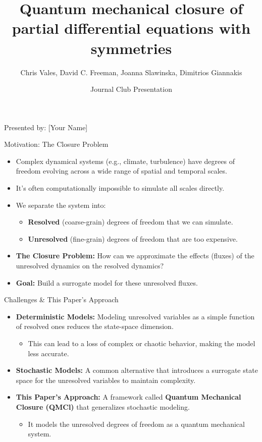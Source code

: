 \documentclass{beamer}
\title[JC: QM Closure for PDEs]{Quantum mechanical closure of partial differential equations with symmetries}
\author{Chris Vales, David C. Freeman, Joanna Slawinska, Dimitrios Giannakis}
\institute{Department of Mathematics, Dartmouth College}
\date{Journal Club Presentation}
\begin{document}
\begin{frame}
    \titlepage
    \begin{center}
        \vspace{1cm}
        Presented by: [Your Name]
    \end{center}
\end{frame}

\begin{frame}{Motivation: The Closure Problem}
    \begin{itemize}
        \item Complex dynamical systems (e.g., climate, turbulence) have degrees of freedom evolving across a wide range of spatial and temporal scales.
        \item It's often computationally impossible to simulate all scales directly.
        \item We separate the system into:
        \begin{itemize}
            \item \textbf{Resolved} (coarse-grain) degrees of freedom that we can simulate.
            \item \textbf{Unresolved} (fine-grain) degrees of freedom that are too expensive.
        \end{itemize}
        \item \textbf{The Closure Problem:} How can we approximate the effects (fluxes) of the unresolved dynamics on the resolved dynamics?
        \item \textbf{Goal:} Build a surrogate model for these unresolved fluxes.
    \end{itemize}
\end{frame}

\begin{frame}{Challenges \& This Paper's Approach}
    \begin{itemize}
        \item \textbf{Deterministic Models:} Modeling unresolved variables as a simple function of resolved ones reduces the state-space dimension.
        \begin{itemize}
            \item This can lead to a loss of complex or chaotic behavior, making the model less accurate.
        \end{itemize}
        \vspace{0.5cm}
        \item \textbf{Stochastic Models:} A common alternative that introduces a surrogate state space for the unresolved variables to maintain complexity.
        \vspace{0.5cm}
        \item \textbf{This Paper's Approach:} A framework called \textbf{Quantum Mechanical Closure (QMCl)} that generalizes stochastic modeling.
        \begin{itemize}
            \item It models the unresolved degrees of freedom as a quantum mechanical system.
        \end{itemize}
    \end{itemize}
\end{frame}
\end{document}
